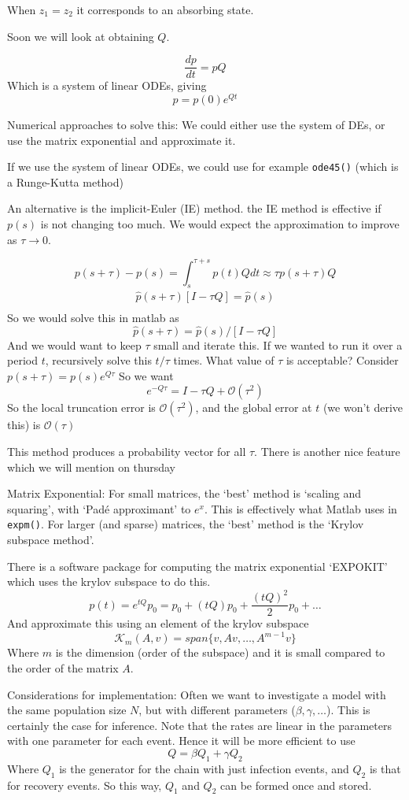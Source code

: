 \documentclass{/home/janmebows/Documents/LatexTemplates/myassignment}
\begin{document}
When $z_1 = z_2$ it corresponds to an absorbing state.


Soon we will look at obtaining $Q$.

\[\frac{dp}{dt} = pQ\]
Which is a system of linear ODEs, giving
\[p = p(0) e^{Qt} \]

Numerical approaches to solve this: We could either use the system of DEs, or use the matrix exponential and approximate it.

If we use the system of linear ODEs, we could use for example \verb|ode45()| (which is a Runge-Kutta method)

An alternative is the implicit-Euler (IE) method. 
the IE method is effective if $p(s)$ is not changing too much. We would expect the approximation to improve as $\tau \to 0$.

\[p(s+\tau) - p(s) = \int_s^{\tau +s} p(t) Q dt \approx \tau p(s+\tau) Q\]
\begin{align*}
    \hat{p}(s+\tau)[I - \tau Q] = \hat{p}(s)\\
\end{align*}
So we would solve this in matlab as
\[\hat{p}(s+\tau) = \hat{p}(s)/[I - \tau Q] \]
And we would want to keep $\tau$ small and iterate this.
If we wanted to run it over a period $t$, recursively solve this $t/\tau$ times.
What value of $\tau$ is acceptable? Consider $p(s+\tau) = p(s) e^{Q\tau}$
So we want
\[e^{-Q\tau} = I-\tau Q + \mathcal{O}(\tau^2)\]
So the local truncation error is $\mathcal{O}(\tau^2)$, and the global error at $t$ (we won't derive this) is $\mathcal{O}(\tau)$


This method produces a probability vector for all $\tau$. 
There is another nice feature which we will mention on thursday


Matrix Exponential:
For small matrices, the `best' method is `scaling and squaring', with `Pad\'e approximant' to $e^x$. This is effectively what Matlab uses in \verb|expm()|. For larger (and sparse) matrices, the `best' method is the `Krylov subspace method'. 

There is a software package for computing the matrix exponential `EXPOKIT' which uses the krylov subspace to do this.
\[p(t) = e^{tQ}p_0 = p_0 + (tQ)p_0 + \frac{(tQ)^2}{2} p_0 +\hdots\]
And approximate this using an element of the krylov subspace
\[\mathcal{K}_m(A,v) = span\{v,Av,\hdots,A^{m-1}v\}\]
Where $m$ is the dimension (order of the subspace) and it is small compared to the order of the matrix $A$.



Considerations for implementation:
Often we want to investigate a model with the same population size $N$, but with different parameters ($\beta,\gamma,\hdots$). This is certainly the case for inference. Note that the rates are linear in the parameters with one parameter for each event.
Hence it will be more efficient to use
\[Q = \beta Q_1 + \gamma Q_2\]
Where $Q_1$ is the generator for the chain with just infection events, and $Q_2$ is that for recovery events. So this way, $Q_1$ and $Q_2$ can be formed once and stored.
\end{document}
